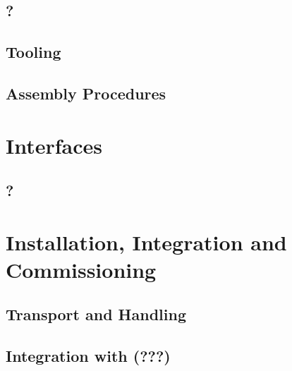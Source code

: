 \subsection{?}
\label{sec:fdsp-tpc-elec-?}



\subsection{Tooling}
\label{sec:fdsp-tpc-elec-tooling}


\subsection{Assembly Procedures}
\label{sec:fdsp-tpc-elec-assy}



\section{Interfaces}
\label{sec:fdsp-tpc-elec-intfc}



\subsection{?}
\label{sec:fdsp-tpc-elec-intfc-?}




\section{Installation, Integration and Commissioning}
\label{sec:fdsp-tpc-elec-install}

\subsection{Transport and Handling}
\label{sec:fdsp-tpc-elec-install-transport}


\subsection{Integration with (???)}
\label{sec:fdsp-tpc-elec-install-integ}


